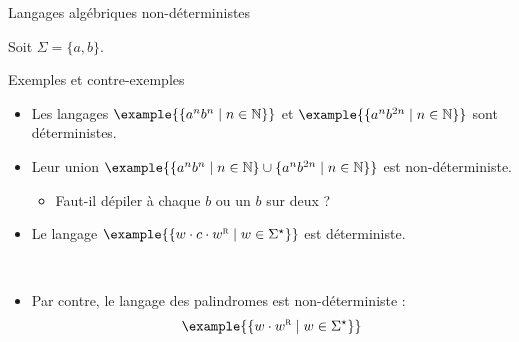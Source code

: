 
\begingroup

\begin{frame}{Langages algébriques non-déterministes}
  
  Soit $\Sigma = \{a, b\}$.
  
  \begin{exampleblock}{Exemples et contre-exemples}
    \begin{itemize}
    \item Les langages $\example{\{ a^n b^n \mid n\in \mathbb{N}\}}$ et $\example{\{ a^n b^{2n} \mid n\in \mathbb{N}\}}$ sont déterministes.
    \item\vspace{2mm} Leur union $\example{\{ a^n b^n \mid n\in \mathbb{N}\} \cup \{ a^n b^{2n} \mid n\in \mathbb{N}\}}$ est non-déterministe.
      \begin{itemize}
      \item Faut-il dépiler à chaque $b$ ou un $b$ sur deux ? 
      \end{itemize}
    \item\vspace{2mm} Le langage $\example{\{ w \cdot c \cdot w^{\textsc{r}} \mid w\in \Sigma^\star\}}$ est déterministe.
      \begin{center}
        \\
      \end{center}
    \item\vspace{2mm} Par contre, le langage des palindromes est non-déterministe :
      $$\example{\{ w \cdot w^{\textsc{r}} \mid w\in \Sigma^\star\}}$$
    \end{itemize}
  \end{exampleblock}

\end{frame}

\endgroup
